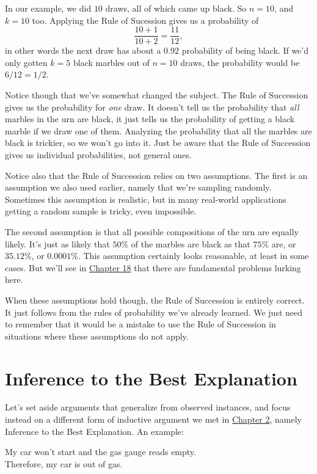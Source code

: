 \documentclass[justified]{tufte-book}
\theoremstyle{definition}
\theoremstyle{definition}
\theoremstyle{definition}
\theoremstyle{definition}
\theoremstyle{remark}
\begin{document}
In our example, we did \(10\) draws, all of which came up black. So \(n = 10\), and \(k = 10\) too. Applying the Rule of Sucession gives us a probability of
\[ \frac{10 + 1}{10 + 2} = \frac{11}{12}, \]
in other words the next draw has about a \(0.92\) probability of being black. If we'd only gotten \(k = 5\) black marbles out of \(n = 10\) draws, the probability would be \(6/12 = 1/2\).

Notice though that we've somewhat changed the subject. The Rule of Succession gives us the probability for \emph{one} draw. It doesn't tell us the probability that \emph{all} marbles in the urn are black, it just tells us the probability of getting a black marble if we draw one of them. Analyzing the probability that all the marbles are black is trickier, so we won't go into it. Just be aware that the Rule of Succession gives us individual probabilities, not general ones.

Notice also that the Rule of Succession relies on two assumptions. The first is an assumption we also used earlier, namely that we're sampling randomly. Sometimes this assumption is realistic, but in many real-world applications getting a random sample is tricky, even impossible.

The second assumption is that all possible compositions of the urn are equally likely. It's just as likely that \(50\%\) of the marbles are black as that \(75\%\) are, or \(35.12\%\), or \(0.0001\%\). This assumption certainly looks reasonable, at least in some cases. But we'll see in \protect\hyperlink{priors}{Chapter 18} that there are fundamental problems lurking here.

When these assumptions hold though, the Rule of Succession is entirely correct. It just follows from the rules of probability we've already learned. We just need to remember that it would be a mistake to use the Rule of Succession in situations where these assumptions do not apply.

\hypertarget{bayesibe}{%
\section{Inference to the Best Explanation}\label{bayesibe}}

Let's set aside arguments that generalize from observed instances, and focus instead on a different form of inductive argument we met in \protect\hyperlink{logic}{Chapter 2}, namely Inference to the Best Explanation. An example:

\begin{argument}
My car won't start and the gas gauge reads empty.\\
Therefore, my car is out of gas.
\end{argument}
\end{document}
